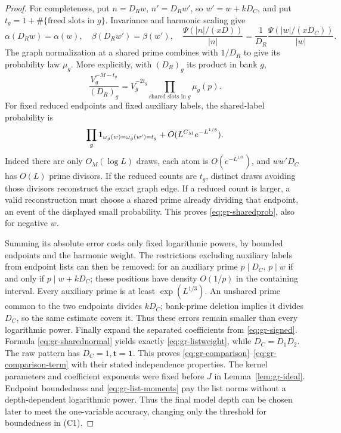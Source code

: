 \begin{proof}
For completeness, put \(n=D_Rw\), \(n'=D_Rw'\), so
\(w'=w+kD_C\), and put \(t_g=1+\#\{\text{freed slots in }g\}\).
Invariance and harmonic scaling give
\[
 \alpha(D_Rw)=\alpha(w),\quad \beta(D_Rw')=\beta(w'),\quad
 \frac{\Psi(|n|/(xD))}{|n|}
       =\frac1{D_R}\frac{\Psi(|w|/(xD_C))}{|w|}.
\]
The graph normalization at a shared prime combines with \(1/D_R\)
to give its probability law \(\mu_g\).
More explicitly, with \((D_R)_g\) its product in bank \(g\),
\begin{equation}
 \frac{V_g^{-M-t_g}}{(D_R)_g}
       =V_g^{-2t_g}
           \prod_{\text{shared slots in }g}\mu_g(p).   \label{eq:gr-sharednormal}
\end{equation}
For fixed reduced endpoints and fixed auxiliary labels,
the shared-label probability is
\begin{equation}
 \prod_g\mathbf 1_{\omega_g(w)=\omega_g(w')=t_g}
              +O(L^{C_M}e^{-L^{1/8}}).               \label{eq:gr-sharedprob}
\end{equation}
Indeed there are only \(O_M(\log L)\) draws, each atom is
\(O(e^{-L^{1/8}})\), and \(ww'D_C\) has \(O(L)\) prime divisors.
If the reduced counts are \(t_g\), distinct draws avoiding those
divisors reconstruct the exact graph edge.  If a reduced count is
larger, a valid reconstruction must choose a shared prime already
dividing that endpoint, an event of the displayed small probability.
This proves \eqref{eq:gr-sharedprob}, also for negative \(w\).

Summing its absolute error costs only fixed logarithmic powers,
by bounded endpoints and the harmonic weight.
The restrictions excluding auxiliary labels from endpoint lists
can then be removed: for an auxiliary prime \(p\mid D_C\),
\(p\mid w\) if and only if \(p\mid w+kD_C\); these positions have
density \(O(1/p)\) in the containing interval.
Every auxiliary prime is at least \(\exp(L^{1/3})\).
An unshared prime common to the two endpoints divides \(kD_C\);
bank-prime deletion implies it divides \(D_C\), so the same estimate
covers it.  Thus these errors remain smaller than every logarithmic
power.  Finally expand the separated coefficients from
\eqref{eq:gr-signed}.  Formula \eqref{eq:gr-sharednormal} yields
exactly \eqref{eq:gr-listweight}, while \(D_C=D_1D_2\).
The raw pattern has \(D_C=1,\mathbf t=\mathbf1\).
This proves \eqref{eq:gr-comparison}--\eqref{eq:gr-comparison-term}
with their stated independence properties.
The kernel parameters and coefficient exponents were fixed before
\(J\) in Lemma~\ref{lem:gr-ideal}. Endpoint boundedness and
\eqref{eq:gr-list-moments} pay the list norms without a
depth-dependent logarithmic power. Thus the final model depth can
be chosen later to meet the one-variable accuracy, changing only
the threshold for boundedness in \textup{(C1)}.
\end{proof}
